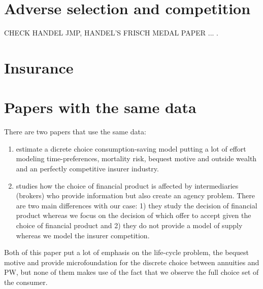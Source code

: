 \documentclass[12pt]{article}
\theoremstyle{plain}
\theoremstyle{plain}
\begin{document}
\section{Adverse selection and competition}
CHECK HANDEL JMP, HANDEL'S FRISCH MEDAL PAPER ... .



\section{Insurance}
\section{Papers with the same data}

There are two papers that use the same data: 
\begin{enumerate}
    \item \textcite{illanes_retirement_2019} 
    estimate a dicrete choice consumption-saving model putting a lot of effort modeling time-preferences, mortality risk, bequest motive and outside wealth and an perfectly competitive insurer industry. 
    
    \item \textcite{boehm_intermediation_2024} studies how the choice of financial product is affected by intermediaries (brokers) who provide information but also create an agency problem. There are two main differences with our case: 1) they study the decision of financial product whereas we focus on the decision of which offer to accept given the choice of financial product and 2) they do not provide a model of supply whereas we model the insurer competition. 
\end{enumerate}
Both of this paper put a lot of emphasis on the life-cycle problem, the bequest motive and provide microfoundation for the discrete choice between annuities and PW, but none of them makes use of the fact that we observe the full choice set of the consumer. 




\printbibliography
 
\end{document}

